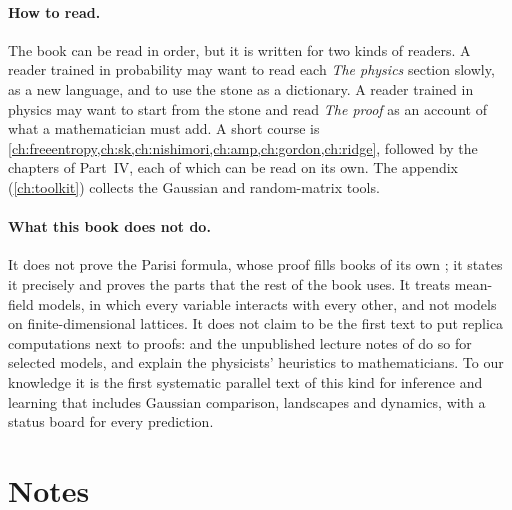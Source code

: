 \begin{refsection}
\paragraph{How to read.} The book can be read in order, but it is written for two kinds of readers. A reader trained in probability may want to read each \emph{The physics} section slowly, as a new language, and to use the stone as a dictionary. A reader trained in physics may want to start from the stone and read \emph{The proof} as an account of what a mathematician must add. A short course is \cref{ch:freeentropy,ch:sk,ch:nishimori,ch:amp,ch:gordon,ch:ridge}, followed by the chapters of Part~IV, each of which can be read on its own. The appendix (\cref{ch:toolkit}) collects the Gaussian and random-matrix tools.

\paragraph{What this book does not do.} It does not prove the Parisi formula, whose proof fills books of its own \parencite{Talagrand2011b,Panchenko2013b}; it states it precisely and proves the parts that the rest of the book uses. It treats mean-field models, in which every variable interacts with every other, and not models on finite-dimensional lattices. It does not claim to be the first text to put replica computations next to proofs: \textcite{MontanariSen2024} and the unpublished lecture notes of \textcite{KrzakalaZdeborova2024} do so for selected models, and \textcite{BandeiraPerryWein2018} explain the physicists' heuristics to mathematicians. To our knowledge it is the first systematic parallel text of this kind for inference and learning that includes Gaussian comparison, landscapes and dynamics, with a status board for every prediction.

\section*{Notes}


\end{refsection}
